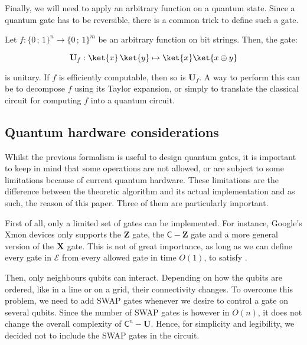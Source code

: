\documentclass[11pt, a4paper]{article}
\begin{document}
                Finally, we will need to apply an arbitrary function on a quantum state. Since a quantum gate has to be reversible, there is a common trick to define such a gate.
                
                \begin{definition}
                    Let \(f:\{0\,;\,1\}^n\to\{0\,;\,1\}^m\) be an arbitrary function on bit strings. Then, the gate:
                    
                    \[\mathbf{U}_f:\ket{x}\,\ket{y}\mapsto\ket{x}\ket{x\oplus y}\]
                    
                    is unitary. If \(f\) is efficiently computable, then so is \(\mathbf{U}_f\). A way to perform this can be to decompose \(f\) using its Taylor expansion, or simply to translate the classical circuit for computing \(f\) into a quantum circuit.
                \end{definition}

        \subsection{Quantum hardware considerations}
            \label{subsec:Hardware}
            Whilst the previous formalism is useful to design quantum gates, it is important to keep in mind that some operations are not allowed, or are subject to some limitations because of current quantum hardware. These limitations are the difference between the theoretic algorithm and its actual implementation and as such, the reason of this paper. Three of them are particularly important.
            
            First of all, only a limited set of gates can be implemented. For instance, Google’s Xmon devices only supports the \(\mathbf{Z}\) gate, the \(\mathsf{C}-\mathbf{Z}\) gate and a more general version of the \(\mathbf{X}\) gate. This is not of great importance, as long as we can define every gate in \(\mathcal{E}\) from every allowed gate in time \(O(1)\), to satisfy .
            
            Then, only neighbours qubits can interact. Depending on how the qubits are ordered, like in a line or on a grid, their connectivity changes. To overcome this problem, we need to add SWAP gates whenever we desire to control a gate on several qubits. Since the number of SWAP gates is however in \(O(n)\), it does not change the overall complexity of \(\mathsf{C}^n-\mathbf{U}\). Hence, for simplicity and legibility, we decided not to include the SWAP gates in the circuit.
            
\end{document}
